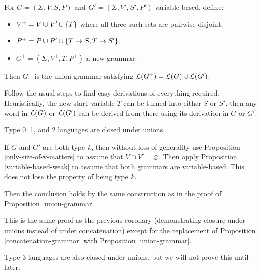 \documentclass{article}
\begin{document}
\begin{proposition}
	\label{union-grammar}
	For $G = (\Sigma, V, S, P)$ and $G' = (\Sigma, V', S', P')$ variable-based, define:
	\begin{itemize}
		\item $V^+ = V \cup V' \cup \left\lbrace T \right\rbrace$ where all three such sets are pairwise disjoint.
		\item $P^+ = P \cup P' \cup \left\lbrace T \to S, T \to S' \right\rbrace$.
		\item $G^+ = (\Sigma, V^+, T, P^+)$ a new grammar.
	\end{itemize}
	Then $G^+$ is the union grammar satisfying $\mathcal{L}(G^+) = \mathcal{L}(G) \cup \mathcal{L}(G')$.
\end{proposition}

\begin{prf}
	Follow the usual steps to find easy derivations of everything required. Heuristically, the new start variable $T$ can be turned into either $S$ or $S'$, then any word in $\mathcal{L}(G)$ or $\mathcal{L}(G')$ can be derived from there using its derivation in $G$ or $G'$.
\end{prf}

\begin{corollary}
	Type 0, 1, and 2 languages are closed under unions.
\end{corollary}

\begin{prf}
	If $G$ and $G'$ are both type $k$, then without loss of generality use Proposition \ref{only-size-of-v-matters} to assume that $V \cap V' = \varnothing$. Then apply Proposition \ref{variable-based-weak} to assume that both grammars are variable-based. This does not lose the property of being type $k$.
	    
	Then the conclusion holds by the same construction as in the proof of Proposition \ref{union-grammar}.
\end{prf}

\begin{note}
	This is the same proof as the previous corollary (demonstrating closure under unions instead of under concatenation) except for the replacement of Proposition \ref{concatenation-grammar} with Proposition \ref{union-grammar}.
\end{note}

\begin{note}
	Type 3 languages are also closed under unions, but we will not prove this until later.
\end{note}
\end{document}

